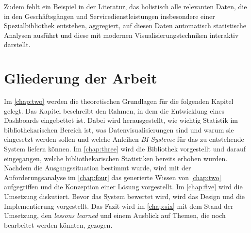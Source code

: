 Zudem fehlt ein Beispiel in der Literatur, das holistisch alle relevanten Daten, die in den
Geschäftsgängen und Servicedienstleistungen insbesondere einer Spezialbibliothek entstehen,
aggregiert, auf diesen Daten automatisch statistische Analysen ausführt und diese mit modernen Visualisierungstechniken
interaktiv darstellt.




\section{Gliederung der Arbeit}
Im \autoref{chap:two} werden die theoretischen Grundlagen für die folgenden Kapitel gelegt. 
Das Kapitel beschreibt den Rahmen, in dem die Entwicklung eines Dashboards eingebettet ist. Dabei wird herausgestellt, wie wichtig Statistik
im bibliothekarischen Bereich ist, was Datenvisualisierungen sind und warum sie eingesetzt werden sollen und welche Anleihen \textit{\acrshort{BI}-Systeme} 
für das zu entstehende System liefern können. Im \autoref{chap:three}
wird die Bibliothek vorgestellt und darauf eingegangen, welche bibliothekarischen Statistiken bereits erhoben wurden.
Nachdem die Ausgangssituation bestimmt wurde, wird mit der Anforderungsanalyse  im \autoref{chap:four} das generierte Wissen von \autoref{chap:two}
aufgegriffen und die Konzeption einer Lösung vorgestellt.
Im \autoref{chap:five} wird die Umsetzung diskutiert. Bevor das System bewertet wird, wird das Design und die Implementierung vorgestellt.
Das Fazit wird im \autoref{chap:six} mit dem Stand der Umsetzung, den \textit{lessons learned} und einem Ausblick auf Themen, die noch bearbeitet werden könnten, gezogen.
